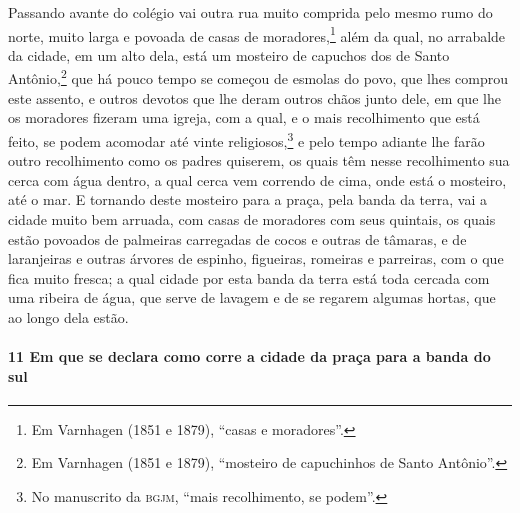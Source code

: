 Passando avante do colégio vai outra rua muito comprida pelo mesmo rumo do norte, muito
larga e povoada de casas de moradores,\footnote{ Em Varnhagen (1851 e 1879), ``casas e
moradores''.} além da qual, no arrabalde da cidade, em um alto dela, está um mosteiro de
capuchos dos de Santo Antônio,\footnote{ Em Varnhagen (1851 e 1879), ``mosteiro de
capuchinhos de Santo Antônio''.} que há pouco tempo se começou de esmolas do povo, que
lhes comprou este assento, e outros devotos que lhe deram outros chãos junto dele, em que
lhe os moradores fizeram uma igreja, com a qual, e o mais recolhimento que está feito, se
podem acomodar até vinte religiosos,\footnote{ No manuscrito da \textsc{bgjm}, ``mais
recolhimento, se podem''.} e pelo tempo adiante lhe farão outro recolhimento como os
padres quiserem, os quais têm nesse recolhimento sua cerca com água dentro, a qual cerca
vem correndo de cima, onde está o mosteiro, até o mar. E tornando deste mosteiro para a
praça, pela banda da terra, vai a cidade muito bem arruada, com casas de moradores com
seus quintais, os quais estão povoados de palmeiras carregadas de cocos e outras de
tâmaras, e de laranjeiras e outras árvores de espinho, figueiras, romeiras e parreiras,
com o que fica muito fresca; a qual cidade por esta banda da terra está toda cercada com
uma ribeira de água, que serve de lavagem e de se regarem algumas hortas, que ao longo
dela estão.

\paragraph{11 Em que se declara como corre a cidade da praça para a banda do sul}

